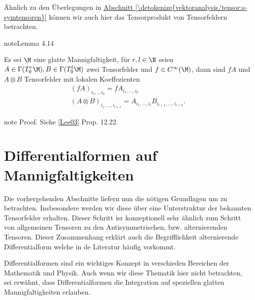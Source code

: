 \documentclass[letterpaper,10pt,german]{jupyterBook}
\begin{document}
\sphinxAtStartPar
Ähnlich zu den Überlegungen in \hyperref[\detokenize{vektoranalysis/tensor:s-symtensoren}]{Abschnitt \ref{\detokenize{vektoranalysis/tensor:s-symtensoren}}} können wir auch hier das Tensorprodukt von Tensorfeldern betrachten.
\label{manifolds/tangential:lemma-47}
\begin{sphinxadmonition}{note}{Lemma 4.14}



\sphinxAtStartPar
Es sei \(\M\) eine glatte Mannigfaltigkeit, für \(r,l\in \N\) seien \(A\in \Gamma(T^r_0\M), B\in \Gamma(T^l_0\M)\) zwei Tensorfelder und \(f\in C^\infty(\M)\), dann sind \(fA\) und \(A\otimes B\) Tensorfelder mit lokalen Koeffezienten
\begin{equation*}
\begin{split}(fA)_{i_1,\ldots i_{k}} = f A_{i_1,\ldots, i_k}\\
(A\otimes B)_{i_1,\ldots,i_{l+r}} = A_{i_1,\ldots, i_l} B_{i_{l+1},\ldots, i_{l+k}}.\end{split}
\end{equation*}\end{sphinxadmonition}

\begin{sphinxadmonition}{note}
\sphinxAtStartPar
Proof. Siehe {[}\hyperlink{cite.references:id18}{Lee03}{]} Prop. 12.22.
\end{sphinxadmonition}


\section{Differentialformen auf Mannigfaltigkeiten}
\label{\detokenize{manifolds/diffformen:differentialformen-auf-mannigfaltigkeiten}}\label{\detokenize{manifolds/diffformen::doc}}
\sphinxAtStartPar
Die vorhergehenden Abschnitte liefern nun die nötigen Grundlagen um  zu betrachten. Insbesondere werden wir diese über eine Unterstruktur der bekannten Tensorfelder erhalten. Dieser Schritt isr konzeptionell sehr ähnlich zum Schritt von allgemeinen Tensoren zu den Antisymmetrischen, bzw. alternierenden Tensoren. Dieser Zusammenhang erklärt auch die Begrifflichkeit alternierende Differentialform welche in de Literatur häufig vorkommt.

\sphinxAtStartPar
Differentialformen sind ein wichtiges Konzept in verschieden Bereichen der Mathematik und Physik. Auch wenn wir diese Thematik hier nicht betrachten, sei erwähnt, dass Differentialformen die Integration auf speziellen glatten Mannigfaltigkeiten erlauben.
\end{document}
